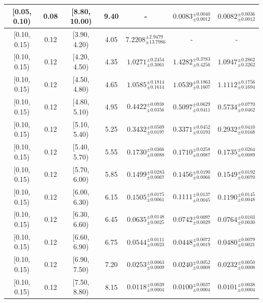 \begin{longtable}{|c|c|c|c|c|c|c|}
\hline
[0.05, 0.10) & 0.08 & [8.80, 10.00) & 9.40 & - & $0.0083^{ \pm 0.0040 }_{ \pm 0.0012 }$ & $0.0082^{ \pm 0.0036 }_{ \pm 0.0012 }$ \\ 
\hline
[0.10, 0.15) & 0.12 & [3.90, 4.20) & 4.05 & $7.2208^{ \pm 2.9479 }_{ \pm 13.7986 }$ & - & - \\ 
\hline
[0.10, 0.15) & 0.12 & [4.20, 4.50) & 4.35 & $1.0271^{ \pm 0.2454 }_{ \pm 0.3061 }$ & $1.4282^{ \pm 0.3783 }_{ \pm 0.4256 }$ & $1.0947^{ \pm 0.2862 }_{ \pm 0.3262 }$ \\ 
\hline
[0.10, 0.15) & 0.12 & [4.50, 4.80) & 4.65 & $1.0585^{ \pm 0.1814 }_{ \pm 0.1614 }$ & $1.0539^{ \pm 0.1863 }_{ \pm 0.1607 }$ & $1.1112^{ \pm 0.1756 }_{ \pm 0.1694 }$ \\ 
\hline
[0.10, 0.15) & 0.12 & [4.80, 5.10) & 4.95 & $0.4422^{ \pm 0.0938 }_{ \pm 0.0356 }$ & $0.5097^{ \pm 0.0629 }_{ \pm 0.0411 }$ & $0.5734^{ \pm 0.0770 }_{ \pm 0.0462 }$ \\ 
\hline
[0.10, 0.15) & 0.12 & [5.10, 5.40) & 5.25 & $0.3432^{ \pm 0.0569 }_{ \pm 0.0197 }$ & $0.3371^{ \pm 0.0452 }_{ \pm 0.0193 }$ & $0.2932^{ \pm 0.0410 }_{ \pm 0.0168 }$ \\ 
\hline
[0.10, 0.15) & 0.12 & [5.40, 5.70) & 5.55 & $0.1730^{ \pm 0.0366 }_{ \pm 0.0088 }$ & $0.1710^{ \pm 0.0258 }_{ \pm 0.0087 }$ & $0.1735^{ \pm 0.0264 }_{ \pm 0.0089 }$ \\ 
\hline
[0.10, 0.15) & 0.12 & [5.70, 6.00) & 5.85 & $0.1499^{ \pm 0.0283 }_{ \pm 0.0067 }$ & $0.1456^{ \pm 0.0190 }_{ \pm 0.0066 }$ & $0.1549^{ \pm 0.0192 }_{ \pm 0.0070 }$ \\ 
\hline
[0.10, 0.15) & 0.12 & [6.00, 6.30) & 6.15 & $0.1505^{ \pm 0.0175 }_{ \pm 0.0061 }$ & $0.1111^{ \pm 0.0137 }_{ \pm 0.0045 }$ & $0.1190^{ \pm 0.0145 }_{ \pm 0.0048 }$ \\ 
\hline
[0.10, 0.15) & 0.12 & [6.30, 6.60) & 6.45 & $0.0635^{ \pm 0.0148 }_{ \pm 0.0025 }$ & $0.0742^{ \pm 0.0097 }_{ \pm 0.0029 }$ & $0.0764^{ \pm 0.0103 }_{ \pm 0.0030 }$ \\ 
\hline
[0.10, 0.15) & 0.12 & [6.60, 6.90) & 6.75 & $0.0544^{ \pm 0.0111 }_{ \pm 0.0023 }$ & $0.0448^{ \pm 0.0072 }_{ \pm 0.0019 }$ & $0.0480^{ \pm 0.0079 }_{ \pm 0.0021 }$ \\ 
\hline
[0.10, 0.15) & 0.12 & [6.90, 7.50) & 7.20 & $0.0253^{ \pm 0.0063 }_{ \pm 0.0009 }$ & $0.0240^{ \pm 0.0052 }_{ \pm 0.0008 }$ & $0.0232^{ \pm 0.0050 }_{ \pm 0.0008 }$ \\ 
\hline
[0.10, 0.15) & 0.12 & [7.50, 8.80) & 8.15 & $0.0118^{ \pm 0.0039 }_{ \pm 0.0004 }$ & $0.0100^{ \pm 0.0037 }_{ \pm 0.0004 }$ & $0.0101^{ \pm 0.0038 }_{ \pm 0.0004 }$ \\ 

\end{longtable}

